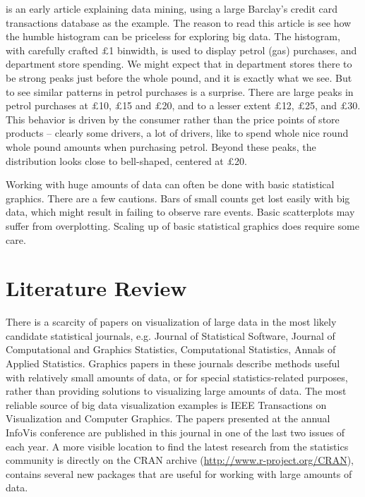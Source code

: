 \documentclass[11pt]{article}
\begin{document}
\citet{hand2000} is an early article explaining data mining, using a large Barclay's credit card transactions database as the example. The reason to read this article is see how the humble histogram can be priceless for exploring big data. The histogram, with carefully crafted $\pounds$1 binwidth, is used to display petrol (gas) purchases, and department store spending. We might expect that in department stores there to be strong peaks just before the whole pound, and it is exactly what we see. But to see similar patterns in petrol purchases is a surprise. There are large peaks in petrol purchases at $\pounds$10, $\pounds$15 and $\pounds$20, and to a lesser extent $\pounds$12, $\pounds$25, and $\pounds$30. This behavior is driven by the consumer rather than the price points of store products -- clearly some drivers, a lot of drivers, like to spend whole nice round whole pound amounts when purchasing petrol. Beyond these peaks, the distribution looks close to bell-shaped, centered at $\pounds$20.

Working with huge amounts of data can often be done with basic statistical graphics. There are a few cautions. Bars of small counts get lost easily with big data, which might result in failing to observe rare events. Basic scatterplots may suffer from overplotting.  Scaling up of basic statistical graphics does require some care.

\section{Literature Review}

There is a scarcity of papers on visualization of large data in the most likely candidate statistical journals, e.g. Journal of Statistical Software, Journal of Computational and Graphics Statistics, Computational Statistics, Annals of Applied Statistics. Graphics papers in these journals describe methods useful with relatively small amounts of data, or for special statistics-related purposes, rather than providing solutions to visualizing large amounts of data. The most reliable source of big data visualization examples is IEEE Transactions on Visualization and Computer Graphics. The papers presented at the annual InfoVis conference are published in this journal in one of the last two issues of each year. A more visible location to find the latest research from the statistics community is directly on the CRAN archive (\url{http://www.r-project.org/CRAN}), contains several new packages that are useful for working with large amounts of data.
\end{document}
